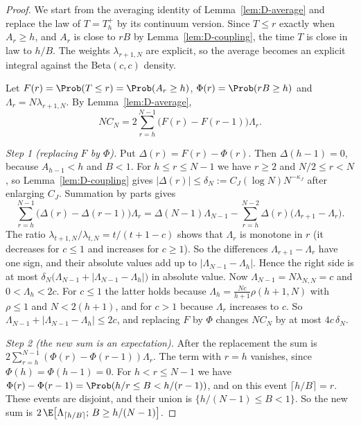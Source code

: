 \begin{proof}
We start from the averaging identity of Lemma~\ref{lem:D-average} and replace
the law of $T=T^+_h$ by its continuum version. Since $T\le r$ exactly when
$A_r\ge h$, and $A_r$ is close to $rB$ by Lemma~\ref{lem:D-coupling}, the
time $T$ is close in law to $h/B$. The weights $\lambda_{r+1,N}$ are
explicit, so the average becomes an explicit integral against the
Beta$(c,c)$ density.

Let $F(r)=\Prob(T\le r)=\Prob(A_r\ge h)$, $\Phi(r)=\Prob(rB\ge h)$ and
$\Lambda_r=N\lambda_{r+1,N}$. By Lemma~\ref{lem:D-average},
\[
NC_N=2\sum_{r=h}^{N-1}\bigl(F(r)-F(r-1)\bigr)\Lambda_r .
\]

\emph{Step 1 (replacing $F$ by $\Phi$).} Put $\Delta(r)=F(r)-\Phi(r)$. Then
$\Delta(h-1)=0$, because $A_{h-1}<h$ and $B<1$. For $h\le r\le N-1$ we have
$r\ge2$ and $N/2\le r<N$, so Lemma~\ref{lem:D-coupling} gives
$\lvert\Delta(r)\rvert\le\delta_N:=C_J(\log N)N^{-\kappa_J}$ after enlarging
$C_J$. Summation by parts gives
\[
\sum_{r=h}^{N-1}\bigl(\Delta(r)-\Delta(r-1)\bigr)\Lambda_r
=\Delta(N-1)\Lambda_{N-1}-\sum_{r=h}^{N-2}\Delta(r)\bigl(\Lambda_{r+1}-\Lambda_r\bigr).
\]
The ratio $\lambda_{t+1,N}/\lambda_{t,N}=t/(t+1-c)$ shows that $\Lambda_r$ is
monotone in $r$ (it decreases for $c\le1$ and increases for $c\ge1$). So the
differences $\Lambda_{r+1}-\Lambda_r$ have one sign, and their absolute
values add up to $\lvert\Lambda_{N-1}-\Lambda_h\rvert$. Hence the right side
is at most
$\delta_N\bigl(\Lambda_{N-1}+\lvert\Lambda_{N-1}-\Lambda_h\rvert\bigr)$ in
absolute value. Now $\Lambda_{N-1}=N\lambda_{N,N}=c$ and $0<\Lambda_h<2c$. For
$c\le1$ the latter holds because $\Lambda_h=\frac{Nc}{h+1}\rho(h+1,N)$ with
$\rho\le1$ and $N<2(h+1)$, and for $c>1$ because $\Lambda_r$ increases to
$c$. So $\Lambda_{N-1}+\lvert\Lambda_{N-1}-\Lambda_h\rvert\le2c$, and
replacing $F$ by $\Phi$ changes $NC_N$ by at most $4c\,\delta_N$.

\emph{Step 2 (the new sum is an expectation).} After the replacement the sum
is $2\sum_{r=h}^{N-1}(\Phi(r)-\Phi(r-1))\Lambda_r$. The term with $r=h$
vanishes, since $\Phi(h)=\Phi(h-1)=0$. For $h<r\le N-1$ we have
$\Phi(r)-\Phi(r-1)=\Prob(h/r\le B<h/(r-1))$, and on this event
$\lceil h/B\rceil=r$. These events are disjoint, and their union is
$\{h/(N-1)\le B<1\}$. So the new sum is
$2\,\E\bigl[\Lambda_{\lceil h/B\rceil};\,B\ge h/(N-1)\bigr]$.


\end{proof}
